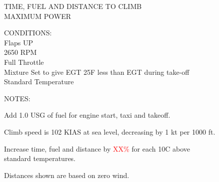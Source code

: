 \begin{figure}[t]
\begin{center}
\begin{perfhdr}TIME, FUEL AND DISTANCE TO CLIMB\\
MAXIMUM POWER\\
\end{perfhdr}
\Large
\normalsize \vspace{5ex} 
\raggedright 
    CONDITIONS:\\
    Flaps UP\\
    2650 RPM\\
    Full Throttle\\
    Mixture Set to give EGT 25\textdegree F less than EGT during take-off\\
    Standard Temperature\\

\hfill

\vspace{\perfnoteskip}
    \raggedright NOTES:
    \begin{enumerate*}
      \item Add 1.0 USG of fuel for engine start, taxi and takeoff.
      \item Climb speed is 102 KIAS at sea level, decreasing by 1 kt per 1000 ft.
      \item Increase time, fuel and distance by \textcolor{red}{XX\%} for each 10\textdegree C above standard
      temperatures.
      \item Distances shown are based on zero wind.
      \end{enumerate*}

\vspace{\perfnoteskip}
\settowidth{\colOne}{WEIGHT}
\settowidth{\colTwo}{PRESS.}
\settowidth{\colThree}{TEMP}
\settowidth{\colFour}{CLIMB}
\settowidth{\colFive}{RATE OF}
\settowidth{\colSix}{TIME}
\settowidth{\colSeven}{USED}
\settowidth{\colEight}{DIST.}


\end{center}
\end{figure}

